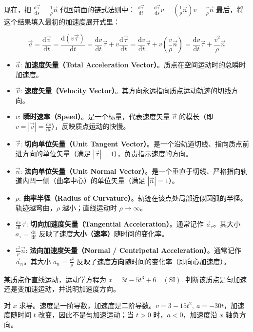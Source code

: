 \documentclass[lang=cn,11pt]{elegantbook}
\begin{document}
现在，把 $\frac{\mathrm{d}\vec{\tau}}{\mathrm{d}s} = \frac{1}{\rho}\vec{n}$ 代回前面的链式法则中： \(\frac{\mathrm{d}\vec{\tau}}{\mathrm{d}t} = \frac{\mathrm{d}\vec{\tau}}{\mathrm{d}s} v = \left(\frac{1}{\rho}\vec{n}\right) v = \frac{v}{\rho}\vec{n}\) 最后，将这个结果填入最初的加速度展开式里：
\begin{definition}
$$\vec{a} = \frac{\mathrm{d}\vec{v}}{\mathrm{d}t} = \frac{\mathrm{d}(v\vec{\tau})}{\mathrm{d}t} = \frac{\mathrm{d}v}{\mathrm{d}t}\vec{\tau} + v\frac{\mathrm{d}\vec{\tau}}{\mathrm{d}t} = \frac{\mathrm{d}v}{\mathrm{d}t}\vec{\tau} + v\left(\frac{v}{\rho}\vec{n}\right)= \frac{\mathrm{d}v}{\mathrm{d}t}\vec{\tau} + \frac{v^2}{\rho}\vec{n}$$
\begin{itemize}
\item $\vec{a}$: \textbf{加速度矢量（Total Acceleration Vector）}。质点在空间运动时的总瞬时加速度。
\item $\vec{v}$: \textbf{速度矢量（Velocity Vector）}。其方向永远指向质点运动轨迹的切线方向。
\item $v$: \textbf{瞬时速率（Speed）}。是一个标量，代表速度矢量 $\vec{v}$ 的模长（即 $v = |\vec{v}| = \frac{\mathrm{d}s}{\mathrm{d}t}$），反映质点运动的快慢。
\item $\vec{\tau}$: \textbf{切向单位矢量（Unit Tangent Vector）}。是一个沿轨道切线、指向质点前进方向的单位矢量（满足 $|\vec{\tau}| = 1$），负责指示速度的方向。
\item $\vec{n}$: \textbf{法向单位矢量（Unit Normal Vector）}。是一个垂直于切线、严格指向轨道内凹一侧（曲率中心）的单位矢量（满足 $|\vec{n}| = 1$）。
\item $\rho$: \textbf{曲率半径（Radius of Curvature）}。轨迹在该点处局部近似圆弧的半径。轨迹越弯曲，$\rho$ 越小；直线运动时 $\rho \to \infty$。
\item $\frac{\mathrm{d}v}{\mathrm{d}t}\vec{\tau}$: \textbf{切向加速度矢量（Tangential Acceleration）}。通常记作 $\vec{a}_\tau$。其大小 $a_\tau = \frac{\mathrm{d}v}{\mathrm{d}t}$ 反映了速度\textbf{大小（速率）}随时间的变化率。
\item $\frac{v^2}{\rho}\vec{n}$: \textbf{法向加速度矢量（Normal / Centripetal Acceleration）}。通常记作 $\vec{a}_n$。其大小 $a_n = \frac{v^2}{\rho}$ 反映了速度\textbf{方向}随时间的变化率（即向心加速度）。
\end{itemize}
\end{definition}

\begin{exercise}
某质点作直线运动，运动学方程为
 \(x=3t-5t^3+6\quad(\mathrm{SI}).\) 
判断该质点是匀加速还是变加速运动，并说明加速度方向。
\end{exercise}
\begin{solution}
对 \(x\) 求导。速度是一阶导数，加速度是二阶导数。$v=3-15t^2,~ a=-30t$，加速度随时间 \(t\) 改变，因此不是匀加速运动；当 \(t>0\) 时，\(a<0\)，加速度沿 \(x\) 轴负方向。
\end{solution}
\end{document}
